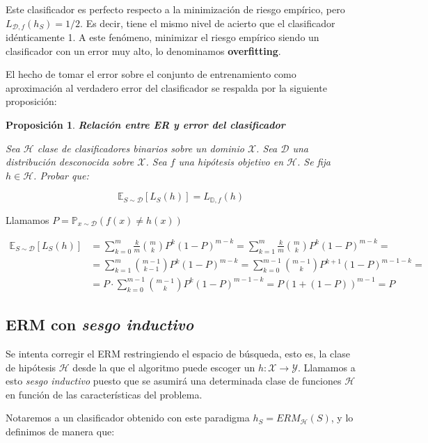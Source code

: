 \documentclass[11pt]{article}
\newtheorem{fact}{Proposición}
\begin{document}
Este clasificador es perfecto respecto a la minimización de riesgo empírico, pero $L_{\mathcal{D}, f}(h_S) = 1/2$. Es decir, tiene el mismo nivel de acierto que el clasificador idénticamente 1. A este fenómeno, minimizar el riesgo empírico siendo un clasificador con un error muy alto, lo denominamos \textbf{overfitting}.

El hecho de tomar el error sobre el conjunto de entrenamiento como aproximación al verdadero error del clasificador se respalda por la siguiente proposición:

\begin{fact}
\textbf{Relación entre ER y error del clasificador}

Sea $\mathcal{H}$ clase de clasificadores binarios sobre un dominio $\mathcal{X}$. Sea $\mathcal{D}$ una distribución desconocida sobre $\mathcal{X}$. Sea $f$ una hipótesis objetivo en $\mathcal{H}$. Se fija $h\in \mathcal{H}$. Probar que: 

\[\mathbb{E}_{S\sim \mathcal{D}} [L_S(h)] = L_{\mathbb{D},f}(h)\]
\end{fact}

Llamamos $P=\mathbb{P}_{x\sim \mathcal{D}}(f(x)\neq h(x))$

\begin{align*}
\mathbb{E}_{S\sim \mathcal{D}} [L_S(h)] &= \sum_{k=0}^m \frac{k}{m} \binom{m}{k} P^k(1-P)^{m-k} = \sum_{k=1}^m \frac{k}{m} \binom{m}{k} P^k(1-P)^{m-k} =\\
&= \sum_{k=1}^m \binom{m-1}{k-1} P^k(1-P)^{m-k} = \sum_{k=0}^{m-1} \binom{m-1}{k} P^{k+1}(1-P)^{m-1-k} = \\
&= P\cdot \sum_{k=0}^{m-1} \binom{m-1}{k} P^{k}(1-P)^{m-1-k} = P(1+(1-P))^{m-1} = P
\end{align*}

\subsection{ERM con \emph{sesgo inductivo}}
\label{sec-1-2}

Se intenta corregir el ERM restringiendo el espacio de búsqueda, esto es, la clase de hipótesis $\mathcal{H}$ desde la que el algoritmo puede escoger un $h: \mathcal{X}\rightarrow \mathcal{Y}$. Llamamos a esto \emph{sesgo inductivo} puesto que se asumirá una determinada clase de funciones $\mathcal{H}$ en función de las características del problema.

Notaremos a un clasificador obtenido con este paradigma $h_S = ERM_{\mathcal{H}}(S)$, y lo definimos de manera que:
\end{document}
